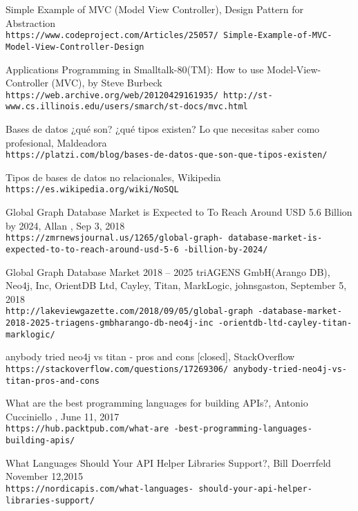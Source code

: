 \begin{thebibliography}{999}
Simple Example of MVC (Model View Controller), Design Pattern for Abstraction
\\\texttt{https://www.codeproject.com/Articles/25057/
Simple-Example-of-MVC-Model-View-Controller-Design}

Applications Programming in Smalltalk-80(TM):
How to use Model-View-Controller (MVC), by Steve Burbeck
\\\texttt{https://web.archive.org/web/20120429161935/
http://st-www.cs.illinois.edu/users/smarch/st-docs/mvc.html}


Bases de datos ¿qué son? ¿qué tipos existen? Lo que necesitas saber como profesional, Maldeadora
\\\texttt{https://platzi.com/blog/bases-de-datos-que-son-que-tipos-existen/}

Tipos de bases de datos no relacionales, Wikipedia
\\\texttt{https://es.wikipedia.org/wiki/NoSQL}

Global Graph Database Market is Expected to To Reach Around USD 5.6 Billion by 2024, Allan , Sep 3, 2018
\\\texttt{https://zmrnewsjournal.us/1265/global-graph-
database-market-is-expected-to-to-reach-around-usd-5-6
-billion-by-2024/}


Global Graph Database Market 2018 – 2025 triAGENS GmbH(Arango DB), Neo4j, Inc, OrientDB Ltd, Cayley, Titan, MarkLogic, johnsgaston, September 5, 2018 
\\\texttt{http://lakeviewgazette.com/2018/09/05/global-graph
-database-market-2018-2025-triagens-gmbharango-db-neo4j-inc
-orientdb-ltd-cayley-titan-marklogic/}

anybody tried neo4j vs titan - pros and cons [closed], StackOverflow
\\\texttt{https://stackoverflow.com/questions/17269306/
anybody-tried-neo4j-vs-titan-pros-and-cons}

What are the best programming languages for building APIs?, Antonio Cucciniello , June 11, 2017
\\\texttt{https://hub.packtpub.com/what-are
-best-programming-languages-building-apis/}

What Languages Should Your API Helper Libraries Support?,  Bill Doerrfeld November 12,2015
\\\texttt{https://nordicapis.com/what-languages-
should-your-api-helper-libraries-support/}


\end{thebibliography}
